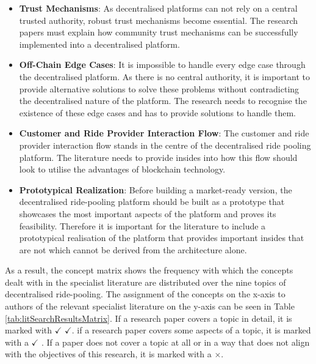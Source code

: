 \begin{itemize}
    \item \textbf{Trust Mechanisms}: As decentralised platforms can not rely on a central trusted authority, robust trust mechanisms become essential. The research papers must explain how community trust mechanisms can be successfully implemented into a decentralised platform.
    
    \item \textbf{Off-Chain Edge Cases}: It is impossible to handle every edge case through the decentralised platform. As there is no central authority, it is important to provide alternative solutions to solve these problems without contradicting the decentralised nature of the platform. The research needs to recognise the existence of these edge cases and has to provide solutions to handle them.
    
    \item \textbf{Customer and Ride Provider Interaction Flow}: The customer and ride provider interaction flow stands in the centre of the decentralised ride pooling platform. The literature needs to provide insides into how this flow should look to utilise the advantages of blockchain technology.
    
    \item \textbf{Prototypical Realization}: Before building a market-ready version, the decentralised ride-pooling platform should be built as a prototype that showcases the most important aspects of the platform and proves its feasibility. Therefore it is important for the literature to include a prototypical realisation of the platform that provides important insides that are not which cannot be derived from the architecture alone.
\end{itemize}


As a result, the concept matrix shows the frequency with which the concepts dealt with in the specialist literature are distributed over the nine topics of decentralised ride-pooling. The assignment of the concepts on the x-axis to authors of the relevant specialist literature on the y-axis can be seen in Table \ref{tab:litSearchResultsMatrix}. If a research paper covers a topic in detail, it is marked with $\checkmark$ $\checkmark$. if a research paper covers some aspects of a topic, it is marked with a $\checkmark$ . If a paper does not cover a topic at all or in a way that does not align with the objectives of this research, it is marked with a $\times$. 



